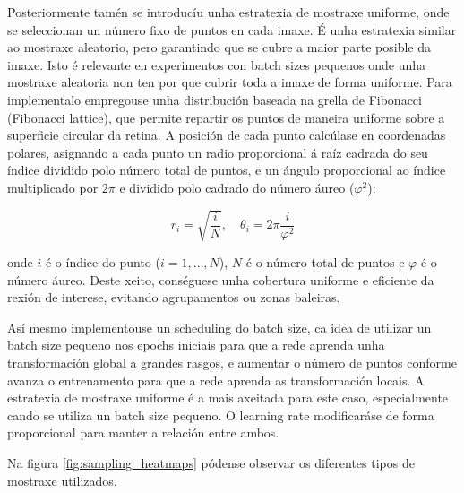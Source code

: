 Posteriormente tamén se introducíu unha estratexia de mostraxe uniforme, onde se seleccionan un número fixo de puntos en cada imaxe.
É unha estratexia similar ao mostraxe aleatorio, pero garantindo que se cubre a maior parte posible da imaxe. Isto é relevante en experimentos con batch sizes pequenos onde unha mostraxe aleatoria non ten por que cubrir toda a imaxe de forma uniforme.
Para implementalo empregouse unha distribución baseada na grella de Fibonacci (Fibonacci lattice), que permite repartir os puntos de maneira uniforme sobre a superficie circular da retina. 
A posición de cada punto calcúlase en coordenadas polares, asignando a cada punto un radio proporcional á raíz cadrada do seu índice dividido polo número total de puntos, e un ángulo proporcional ao índice multiplicado por $2\pi$ e dividido polo cadrado do número áureo ($\varphi^2$):

\[
r_i = \sqrt{\frac{i}{N}}, \quad \theta_i = 2\pi \frac{i}{\varphi^2}
\]

onde $i$ é o índice do punto ($i = 1, \dots, N$), $N$ é o número total de puntos e $\varphi$ é o número áureo. 
Deste xeito, conséguese unha cobertura uniforme e eficiente da rexión de interese, evitando agrupamentos ou zonas baleiras.

Así mesmo implementouse un scheduling do batch size, ca idea de utilizar un batch size pequeno nos epochs iniciais para que a rede aprenda unha transformación global a grandes rasgos, e aumentar o número de puntos conforme avanza o entrenamento para que a rede aprenda as transformación locais.
A estratexia de mostraxe uniforme é a mais axeitada para este caso, especialmente cando se utiliza un batch size pequeno.
O learning rate modificaráse de forma proporcional para manter a relación entre ambos.

Na figura \ref{fig:sampling_heatmaps} pódense observar os diferentes tipos de mostraxe utilizados.

